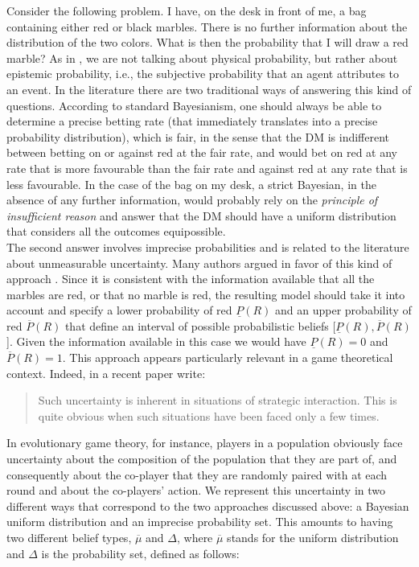 \documentclass[fleqn,reqno,11pt]{article}
\begin{document}
Consider the following problem. I have, on the desk in front of me, a bag containing either red or black marbles. There is no further information about the distribution of the two colors. What is then the probability that I will draw a red marble? As in \citet{walley96}, we are not talking about physical probability, but rather about epistemic probability, i.e., the subjective probability that an agent attributes to an event.
In the literature there are two traditional ways of answering this kind of questions. According to standard Bayesianism, one should always be able to determine a precise betting rate (that immediately translates into a precise probability distribution), which is fair, in the sense that the DM is indifferent between betting on or against red at the fair rate, and would bet on red at any rate that is more favourable than the fair rate and against red at any rate that is less favourable. In the case of the bag on my desk, a strict Bayesian, in the absence of any further information, would probably rely on the \textit{principle of insufficient reason} and answer that the DM should have a uniform distribution that considers all the outcomes equipossible. \\
The second answer involves imprecise probabilities and is related to the literature about unmeasurable uncertainty. Many authors argued in favor of this kind of approach \citep[e.g.,][]{levi74,gardsah82,walley96}. Since it is consistent with the information available that all the marbles are red, or that no marble is red, the resulting model should take it into account and specify a lower probability of red $\underline{P}(R)$ and an upper probability of red $\overline{P}(R)$ that define an interval of possible probabilistic beliefs [$\underline{P}(R), \overline{P}(R)$]. Given the information available in this case we would have $\underline{P}(R)=0$ and $\overline{P}(R)=1$. This approach appears particularly relevant in a game theoretical context. Indeed, in a recent paper \citet{BattCerrMM15} write:

\begin{quote}
Such uncertainty is inherent in situations of strategic interaction. This is quite obvious when such situations have been faced only a few times.
\end{quote}

In evolutionary game theory, for instance, players in a population obviously face uncertainty about the composition of the population that they are part of, and consequently about the co-player that they are randomly paired with at each round and about the co-players' action. We represent this uncertainty in two different ways that correspond to the two approaches discussed above: a Bayesian uniform distribution and an imprecise probability set. This amounts to having two different belief types, $ \overline{\mu}$ and $ \Delta $, where $\overline{\mu}$ stands for the uniform distribution and $\Delta$ is the probability set, defined as follows:
\end{document}
